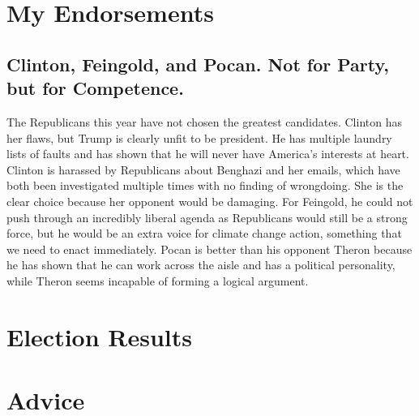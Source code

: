 \documentclass[twoside]{article}
\begin{document}
\section{My Endorsements}
\subsection{Clinton, Feingold, and Pocan. Not for Party, but for Competence.}
The Republicans this year have not chosen the greatest candidates. Clinton has her flaws, but Trump is clearly unfit to be president. He has multiple laundry lists of faults and has shown that he will never have America’s interests at heart. Clinton is harassed by Republicans about Benghazi and her emails, which have both been investigated multiple times with no finding of wrongdoing. She is the clear choice because her opponent would be damaging. For Feingold, he could not push through an incredibly liberal agenda as Republicans would still be a strong force, but he would be an extra voice for climate change action, something that we need to enact immediately. Pocan is better than his opponent Theron because he has shown that he can work across the aisle and has a political personality, while Theron seems incapable of forming a logical argument.
\section{Election Results}
\section{Advice}
\end{document}
